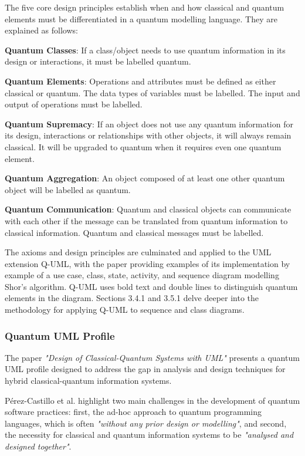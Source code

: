 \documentclass{article}
\begin{document}
{The five core design principles establish when and how classical and quantum elements must be differentiated in a quantum modelling language. They are explained as follows: 

\textbf{Quantum Classes}: If a class/object needs to use quantum information in its design or interactions, it must be labelled quantum.

\textbf{Quantum Elements}: Operations and attributes must be defined as either classical or quantum. The data types of variables must be labelled. The input and output of operations must be labelled. 

\textbf{Quantum Supremacy}: If an object does not use any quantum information for its design, interactions or relationships with other objects, it will always remain classical. It will be upgraded to quantum when it requires even one quantum element. 

\textbf{Quantum Aggregation}: An object composed of at least one other quantum object will be labelled as quantum.

\textbf{Quantum Communication}: Quantum and classical objects can communicate with each other if the message can be translated from quantum information to classical information. Quantum and classical messages must be labelled.

The axioms and design principles are culminated and applied to the UML extension Q-UML, with the paper providing examples of its implementation by example of a use case, class, state, activity, and sequence diagram modelling Shor's algorithm\cite{Pérez-Delgado2022}. Q-UML uses bold text and double lines to distinguish quantum elements in the diagram. Sections 3.4.1 and 3.5.1 delve deeper into the methodology for applying Q-UML to sequence and class diagrams.

\subsubsection{Quantum UML Profile}

The paper \textit{"Design of Classical-Quantum Systems with UML"} presents a quantum UML profile designed to address the gap in analysis and design techniques for hybrid classical-quantum information systems\cite{Pérez-Castillo2022}. 

Pérez-Castillo et al. highlight two main challenges in the development of quantum software practices: first, the ad-hoc approach to quantum programming languages, which is often \textit{"without any prior design or modelling"}\cite{Pérez-Castillo2022}, and second, the necessity for classical and quantum information systems to be \textit{"analysed and designed together"}\cite{Pérez-Castillo2022}. 

}
\end{document}
